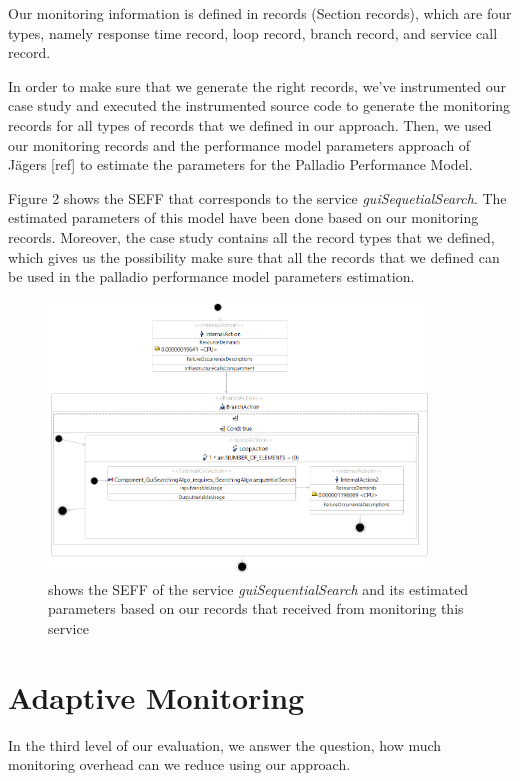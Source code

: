 Our monitoring information is defined in records (Section records), which are four types, namely response time record, loop record, branch record, and service call record. 

In order to make sure that we generate the right records, we've instrumented our case study and executed the instrumented source code to generate the monitoring records for all types of records that we defined in our approach. Then, we used our monitoring records and the performance model parameters approach of Jägers [ref] to estimate the parameters for the Palladio Performance Model.

Figure 2 shows the SEFF that corresponds to the service \textit{guiSequetialSearch}. The estimated parameters of this model have been done based on our monitoring records. Moreover, the case study contains all the record types that we defined, which gives us the possibility make sure that all the records that we defined can be used in the palladio performance model parameters estimation.


\begin{figure}[h]
\centering
\includegraphics[width=0.9\textwidth]{figures/records_evaluation}
\caption{shows the SEFF of the service \textit{guiSequentialSearch} and its estimated parameters based on our records that received from monitoring this service}
\label{fig:guiSequentialSearch_seff}
\end{figure}


\section{Adaptive Monitoring}
\label{sec:Adaptive Monitoring}
In the third level of our evaluation, we answer the question, how much monitoring overhead can we reduce using our approach. 

